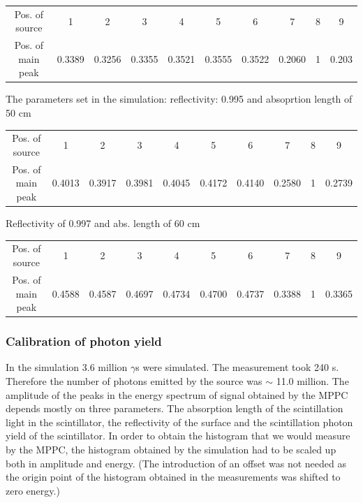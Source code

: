 \documentclass[12pt, a4paper,titlepage]{article}
\numberwithin{equation}{section}
\numberwithin{figure}{section}
\begin{document}
\begin{center}
\begin{tabular}{ |c|c|c|c|c|c|c|c|c|c| } 
 \hline
  Pos. of source & 1 & 2 & 3 & 4 & 5 & 6 & 7 & 8 & 9 \\ 
  Pos. of main peak & 0.3389 & 0.3256 & 0.3355 & 0.3521 & 0.3555 & 0.3522 & 0.2060 & 1 & 0.203  \\ 
 \hline
\end{tabular}
\end{center}


The parameters set in the simulation: reflectivity: 0.995 and absoprtion length of 50 cm

\begin{center}
\begin{tabular}{ |c|c|c|c|c|c|c|c|c|c| } 
 \hline
 Pos. of source & 1 & 2 & 3 & 4 & 5 & 6 & 7 & 8 & 9 \\ 
 Pos. of main peak & 0.4013 & 0.3917 & 0.3981 & 0.4045 & 0.4172 & 0.4140 & 0.2580 & 1 & 0.2739\\ 
 \hline
\end{tabular}
\end{center}

Reflectivity of 0.997 and abs. length of 60 cm

\begin{center}
\begin{tabular}{ |c|c|c|c|c|c|c|c|c|c| } 
 \hline
  Pos. of source & 1 & 2 & 3 & 4 & 5 & 6 & 7 & 8 & 9 \\ 
  Pos. of main peak & 0.4588 & 0.4587 & 0.4697 & 0.4734 & 0.4700 & 0.4737 & 0.3388 & 1 & 0.3365  \\ 
 \hline
\end{tabular}
\end{center}

\pagebreak

\subsubsection{Calibration of photon yield}

In the simulation 3.6 million $\gamma$s were simulated. The measurement took 240 s. Therefore the number of photons emitted by the source was $\sim$ 11.0 million. The amplitude of the peaks in the energy spectrum of signal obtained by the MPPC depends mostly on three parameters. The absorption length of the scintillation light in the scintillator, the reflectivity of the surface and the scintillation photon yield of the scintillator. In order to obtain the histogram that we would measure by the MPPC, the histogram obtained by the simulation had to be scaled up both in amplitude and energy. (The introduction of an offset was not needed as the origin point of the histogram obtained in the measurements was shifted to zero energy.)
\end{document}
